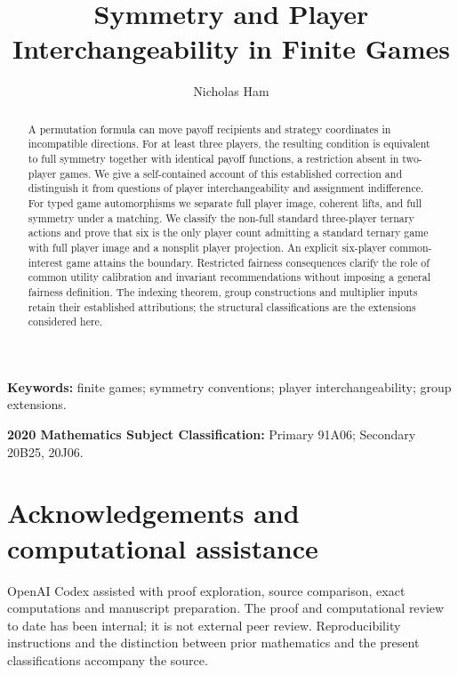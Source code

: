 \documentclass[11pt]{article}
\title{Symmetry and Player Interchangeability in Finite Games}
\author{Nicholas Ham}
\date{}
\begin{document}
\maketitle
\begin{abstract}
A permutation formula can move payoff recipients and strategy coordinates
in incompatible directions. For at least three players, the resulting
condition is equivalent to full symmetry together with identical payoff
functions, a restriction absent in two-player games. We give a self-contained
account of this established correction and distinguish it from questions of
player interchangeability and assignment indifference. For typed game
automorphisms we separate full player image, coherent lifts, and full symmetry
under a matching. We classify the non-full standard three-player ternary
actions and prove that six is the only player count admitting a standard
ternary game with full player image and a nonsplit player projection. An
explicit six-player common-interest game attains the boundary. Restricted
fairness consequences clarify the role of common utility calibration and
invariant recommendations without imposing a general fairness definition.
The indexing theorem, group constructions and multiplier inputs retain their
established attributions; the structural classifications are the extensions
considered here.
\end{abstract}
\noindent\textbf{Keywords:} finite games; symmetry conventions; player interchangeability; group extensions.
\par\smallskip
\noindent\textbf{2020 Mathematics Subject Classification:} Primary 91A06; Secondary 20B25, 20J06.










\appendix

\section*{Acknowledgements and computational assistance}
OpenAI Codex assisted with proof exploration, source comparison, exact
computations and manuscript preparation. The proof and computational review
to date has been internal; it is not external peer review. Reproducibility
instructions and the distinction between prior mathematics and the present
classifications accompany the source.


\end{document}
